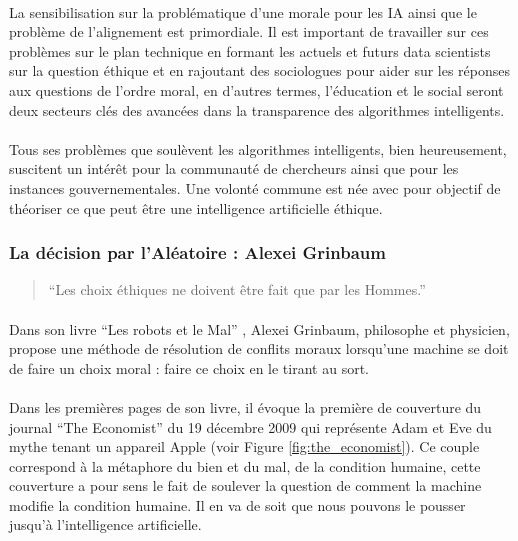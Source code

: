 \documentclass[10pt, french, a4paper]{report}
\begin{document}
\paragraph{}
La sensibilisation sur la problématique d’une morale pour les IA ainsi que le problème de l’alignement est primordiale. Il est important de travailler sur ces problèmes sur le plan technique en formant les actuels et futurs data scientists sur la question éthique et en rajoutant des sociologues pour aider sur les réponses aux questions de l’ordre moral, en d’autres termes, l’éducation et le social seront deux secteurs clés des avancées dans la transparence des algorithmes intelligents.

\paragraph{}
Tous ses problèmes que soulèvent les algorithmes intelligents, bien heureusement, suscitent un intérêt pour la communauté de chercheurs ainsi que pour les instances gouvernementales. Une volonté commune est née avec pour objectif de théoriser ce que peut être une intelligence artificielle éthique.

\subsubsection{La décision par l'Aléatoire : Alexei Grinbaum}

\begin{quotation}
  ``Les choix éthiques ne doivent être fait que par les Hommes.''
\end{quotation}

\paragraph{}
Dans son livre ``Les robots et le Mal'' \citep{grinbaum_les_2019}, Alexei Grinbaum, philosophe et physicien, propose une méthode de résolution de conflits moraux lorsqu'une machine se doit de faire un choix moral : faire ce choix en le tirant au sort.

\paragraph{}
Dans les premières pages de son livre, il évoque la première de couverture du journal ``The Economist'' du 19 décembre 2009 qui représente Adam et Eve du mythe tenant un appareil Apple (voir Figure \ref{fig:the_economist}). Ce couple correspond à la métaphore du bien et du mal, de la condition humaine, cette couverture a pour sens le fait de soulever la question de comment la machine modifie la condition humaine. Il en va de soit que nous pouvons le pousser jusqu'à l'intelligence artificielle.
\end{document}
